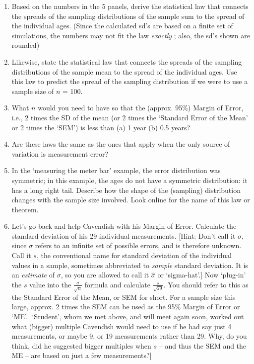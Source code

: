 \documentclass[]{book}
\begin{document}
\begin{enumerate}
\def\labelenumi{\arabic{enumi}.}
\item
  Based on the numbers in the 5 panels, derive the statistical law that connects the spreads of the sampling distributions of the sample sum to the spread of the individual ages. (Since the calculated sd's are based on a finite set of simulations, the numbers may not fit the law \emph{exactly} ; also, the sd's shown are rounded)
\item
  Likewise, state the statistical law that connects the spreads of the sampling distributions of the sample mean to the spread of the individual ages. Use this law to predict the spread of the sampling distribution if we were to use a sample size of \(n\) = 100.
\item
  What \(n\) would you need to have so that the (approx. 95\%) Margin of Error, i.e., 2 times the SD of the mean (or 2 times the `Standard Error of the Mean' or 2 times the `SEM') is less than (a) 1 year (b) 0.5 years?
\item
  Are these laws the same as the ones that apply when the only source of variation is measurement error?
\item
  In the `measuring the meter bar' example, the error distribution was symmetric; in this example, the ages do not have a symmetric distribution: it has a long right tail. Describe how the shape of the (sampling) distribution changes with the sample size involved. Look online for the name of this law or theorem.
\item
  Let's go back and help Cavendish with his Margin of Error. Calculate the standard deviation of his 29 individual measurements. {[}Hint: Don't call it \(\sigma\), since \(\sigma\) refers to an infinite set of possible errors, and is therefore unknown. Call it \(s\), the conventional name for standard deviation of the individual values in a sample, sometimes abbreviated to \emph{sample} standard deviation. It is an \emph{estimate} of \(\sigma\), so you are allowed to call it \(\hat{\sigma}\) or `sigma-hat'.{]} Now `plug-in' the \(s\) value into the \(\frac{\sigma}{\sqrt{n}}\) formula and calculate \(\frac{s}{\sqrt{29}}\). You should refer to this as the Standard Error of the Mean, or SEM for short. For a sample size this large, approx. 2 times the SEM can be used as the 95\% Margin of Error or `ME'. {[}`Student', whom we met above, and will meet again soon, worked out what (bigger) multiple Cavendish would need to use if he had say just 4 measurements, or maybe 9, or 19 measurements rather than 29. Why, do you think, did he suggested bigger multiples when \(s\) -- and thus the SEM and the ME -- are based on just a few measurements?{]}
\end{enumerate}
\end{document}
